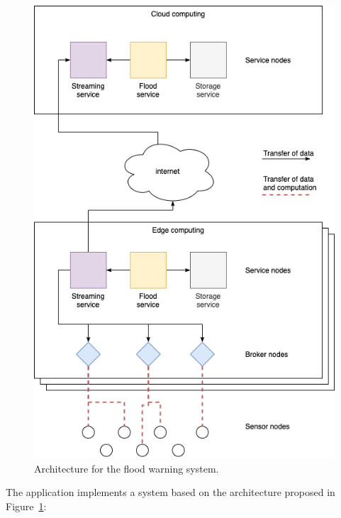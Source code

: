 \begin{figure}[ht]
\centering
\includegraphics[width=\columnwidth]{figures/architecture-levee2}
\caption{Architecture for the flood warning system.}
\label{fig:architecture-levee}
\end{figure}

The application implements a system based on the architecture proposed in Figure~\ref{fig:architecture-levee}:

